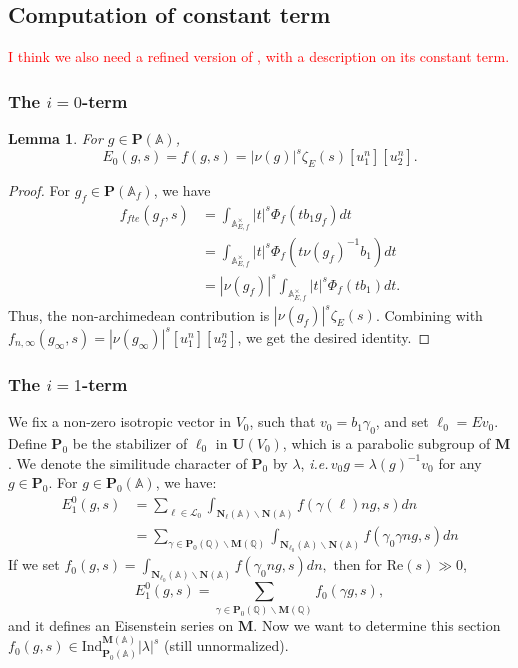 \documentclass[12pt]{article}
\newtheorem{lemma}[thm]{Lemma}
\newtheorem{prop}[thm]{Proposition}
\theoremstyle{remark}
\theoremstyle{definition}
\newcommand{\Q}{\mathbb{Q}}
\newcommand{\A}{\mathbb{A}}
\newcommand{\rmm}[1]{\mathrm{#1}}
\newcommand{\bff}[1]{\mathbf{#1}}
\newcommand{\call}[1]{\mathcal{#1}}
\begin{document}
\subsection{Computation of constant term}
\label{section constant term of Eisenstein series}
\textcolor{red}{I think we also need a refined version of \cite[Corollary 1.2]{Hilado_McGlade_Yan_Fourier_coefficients_unitary_group},
with a description on its constant term.}
\subsubsection{The \texorpdfstring{$i=0$}{PDFstring}-term}
\label{section i=0 part constant term}
\begin{lemma}
    For $g\in \bff{P}(\A)$,
    \[E_{0}(g,s)=f(g,s)=|\nu(g)|^{s}\zeta_{E}(s)[u_{1}^{n}][u_{2}^{n}].\]
\end{lemma}
\begin{proof}
    For $g_{f}\in \bff{P}(\A_{f})$,
    we have 
    \begin{align*}
        f_{fte}(g_f,s)&=\int_{\A_{E,f}^{\times}}|t|^{s}\Phi_{f}(tb_{1}g_{f})dt\\
        &=\int_{\A_{E,f}^{\times}}|t|^{s}\Phi_{f}(t\nu(g_{f})^{-1}b_{1})dt\\
        &=|\nu(g_{f})|^{s}\int_{\A_{E,f}^{\times}}|t|^{s}\Phi_{f}(tb_{1})dt.
    \end{align*}
    Thus, the non-archimedean contribution is $|\nu(g_{f})|^{s}\zeta_{E}(s)$.
    Combining with $f_{n,\infty}(g_{\infty},s)=|\nu(g_{\infty})|^{s}[u_{1}^{n}][u_{2}^{n}]$,
    we get the desired identity.
\end{proof}
\subsubsection{The \texorpdfstring{$i=1$}{PDFstring}-term}
\label{section i=1 part constant term}
We fix a non-zero isotropic vector in $V_{0}$,
such that $v_{0}=b_{1}\gamma_{0}$,
and set $\ell_{0}=Ev_{0}$.
Define $\bff{P}_{0}$ be the stabilizer of $\ell_{0}$ in $\bff{U}(V_{0})$,
which is a parabolic subgroup of $\bff{M}$.
We denote the similitude character of $\bff{P}_{0}$ by $\lambda$,
\emph{i.e.\,}$v_{0}g=\lambda(g)^{-1}v_{0}$ for any $g\in\bff{P}_{0}$.
For $g\in\bff{P}_{0}(\A)$,
we have:
\begin{align*}
    E_{1}^{0}(g,s)&=\sum_{\ell\in \call{L}_{0}}\int_{\bff{N}_{\ell}(\A)\backslash \bff{N}(\A)}f(\gamma(\ell)ng,s)dn \\
    &=\sum_{\gamma\in \bff{P}_{0}(\Q)\backslash\bff{M}(\Q)}\int_{\bff{N}_{\ell_{0}}(\A)\backslash \bff{N}(\A)}f(\gamma_{0}\gamma ng,s)dn
\end{align*}
If we set $f_{0}(g,s)=\int_{\bff{N}_{\ell_{0}}(\A)\backslash \bff{N}(\A)}f(\gamma_{0}ng,s)dn,$
then for $\rmm{Re}(s)\gg 0$,
\[E_{1}^{0}(g,s)=\sum_{\gamma\in\bff{P}_{0}(\Q)\backslash \bff{M}(\Q)}f_{0}(\gamma g,s),\]
and it defines an Eisenstein series on $\bff{M}$.
Now we want to determine this section $f_{0}(g,s)\in\rmm{Ind}_{\bff{P}_{0}(\A)}^{\bff{M}(\A)}|\lambda|^{s}$ (still unnormalized).
   
\end{document}
